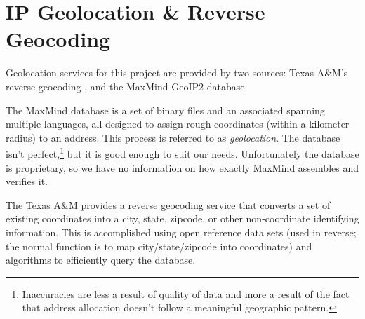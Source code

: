 \section{IP Geolocation \& Reverse Geocoding}\label{sec:background_geolocation}
Geolocation services for this project are provided by two sources: Texas A\&M's reverse geocoding \api, and the MaxMind GeoIP2 database.

The MaxMind database is a set of binary files and an associated \sdk spanning multiple languages, all designed to assign rough coordinates (within a  kilometer radius) to an \ip address. This process is referred to as \textit{\ip geolocation}. The database isn't perfect,\footnote{Inaccuracies are less a result of quality of data and more a result of the fact that \ip address allocation doesn't follow a meaningful geographic pattern.} but it is good enough to suit our needs. Unfortunately the database is proprietary, so we have no information on how exactly MaxMind assembles and verifies it.

The Texas A\&M \api provides a reverse geocoding service that converts a set of existing coordinates into a city, state, zipcode, or other non-coordinate identifying information. This is accomplished using open reference data sets (used in reverse; the normal function is to map city/state/zipcode into coordinates) and algorithms to efficiently query the database.
